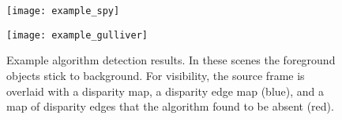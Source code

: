 \begin{figure}[!h]
	\begin{minipage}[b]{1.0\linewidth}
		\centering
		\centerline{ \texttt{[image: example\_spy]} }
	\end{minipage}
	\begin{minipage}[b]{1.0\linewidth}
		\centering
		\centerline{ \texttt{[image: example\_gulliver]} }
	\end{minipage}
    \caption{Example algorithm detection results. In these scenes the foreground
        objects stick to background. For visibility, the source frame is
        overlaid with a disparity map, a disparity edge map (blue), and a map of
        disparity edges that the algorithm  found to be absent (red).}
	\label{fig:res_example}
\end{figure}
